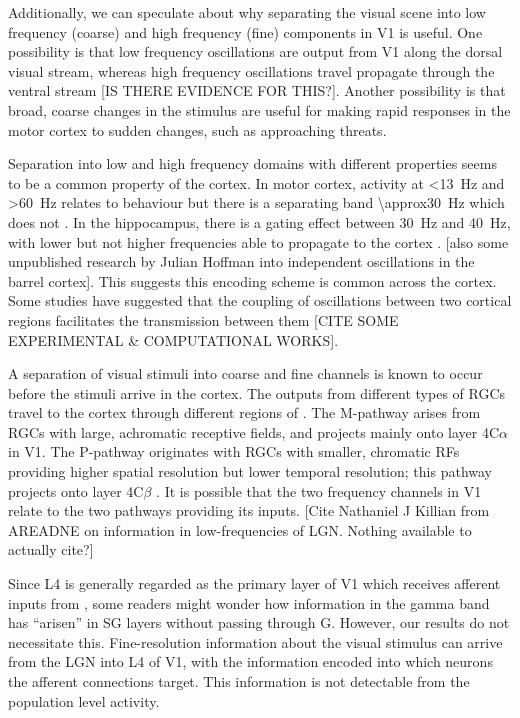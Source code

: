 Additionally, we can speculate about why separating the visual scene into low frequency (coarse) and high frequency (fine) components in \ac{V1} is useful.
One possibility is that low frequency oscillations are output from \ac{V1} along the dorsal visual stream, whereas high frequency oscillations travel propagate through the ventral stream [IS THERE EVIDENCE FOR THIS?].
Another possibility is that broad, coarse changes in the stimulus are useful for making rapid responses in the motor cortex to sudden changes, such as approaching threats.

Separation into low and high frequency domains with different properties seems to be a common property of the cortex.
In motor cortex, activity at \SI{<13}{Hz} and \SI{>60}{Hz} relates to behaviour but there is a separating band \SI{\approx30}{Hz} which does not \citep{Rickert2005}.
In the hippocampus, there is a gating effect between \SI{30}{Hz} and \SI{40}{Hz}, with lower but not higher frequencies able to propagate to the cortex \citep{Moreno2015}.
[also some unpublished research by Julian Hoffman into independent oscillations in the barrel cortex].
This suggests this encoding scheme is common across the cortex.
Some studies have suggested that the coupling of oscillations between two cortical regions facilitates the transmission between them [CITE SOME EXPERIMENTAL \& COMPUTATIONAL WORKS].

A separation of visual stimuli into coarse and fine channels is known to occur before the stimuli arrive in the cortex.
The outputs from different types of \acp{RGC} travel to the cortex through different regions of .
The M-pathway arises from \acp{RGC} with large, achromatic receptive fields, and projects mainly onto layer 4C$\alpha$ in \ac{V1}.
The P-pathway originates with \acp{RGC} with smaller, chromatic \acp{RF} providing higher spatial resolution but lower temporal resolution; this pathway projects onto layer 4C$\beta$ \citep{Callaway1998}.
It is possible that the two frequency channels in \ac{V1} relate to the two pathways providing its inputs.
[Cite Nathaniel J Killian from AREADNE on information in low-frequencies of \ac{LGN}.
Nothing available to actually cite?]

Since \ac{L4} is generally regarded as the primary layer of \ac{V1} which receives afferent inputs from , some readers might wonder how information in the gamma band has ``arisen'' in \ac{SG} layers without passing through \ac{G}.
However, our results do not necessitate this.
Fine-resolution information about the visual stimulus can arrive from the \ac{LGN} into \ac{L4} of \ac{V1}, with the information encoded into which neurons the afferent connections target.
This information is not detectable from the population level activity.


